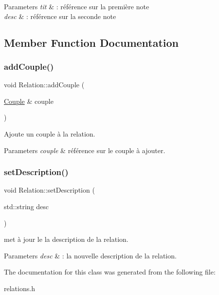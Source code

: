 \begin{DoxyParams}{Parameters}
{\em tit} & \+: référence sur la première note \\
\hline
{\em desc} & \+: référence sur la seconde note \\
\hline
\end{DoxyParams}


\subsection{Member Function Documentation}
\mbox{\label{class_relation_ad51e21a7258d6980f479dbb21f9e510c}} 
\subsubsection{\texorpdfstring{add\+Couple()}{addCouple()}}
{\footnotesize\ttfamily void Relation\+::add\+Couple (\begin{DoxyParamCaption}\item[{\hyperlink{class_couple}{Couple} \&}]{couple }\end{DoxyParamCaption})\hspace{0.3cm}{\ttfamily [inline]}}



Ajoute un couple à la relation. 


\begin{DoxyParams}{Parameters}
{\em couple} & référence sur le couple à ajouter. \\
\hline
\end{DoxyParams}
\mbox{\label{class_relation_a481de051dc44065bb816b9b94b5d0c48}} 
\subsubsection{\texorpdfstring{set\+Description()}{setDescription()}}
{\footnotesize\ttfamily void Relation\+::set\+Description (\begin{DoxyParamCaption}\item[{std\+::string}]{desc }\end{DoxyParamCaption})\hspace{0.3cm}{\ttfamily [inline]}}



met à jour le la description de la relation. 


\begin{DoxyParams}{Parameters}
{\em desc} & \+: la nouvelle description de la relation. \\
\hline
\end{DoxyParams}


The documentation for this class was generated from the following file\+:\begin{DoxyCompactItemize}
\item 
relations.\+h\end{DoxyCompactItemize}
